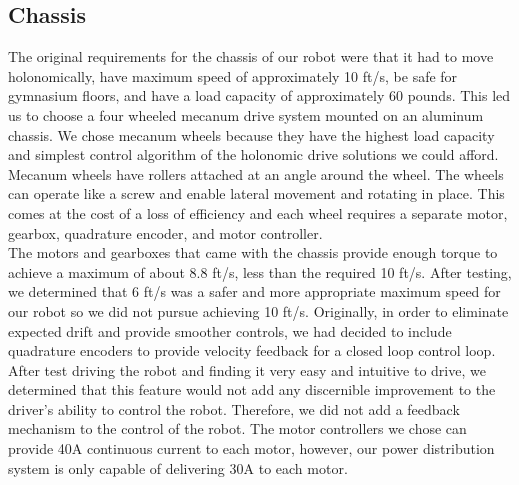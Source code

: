 \documentclass[letterpaper,12pt]{article}
\begin{document}
\subsection{Chassis}
The original requirements for the chassis of our robot were that it had to move
holonomically, have maximum speed of approximately 10
ft/s, be safe for gymnasium floors, and have a load capacity of approximately
60 pounds. This led us to choose a four wheeled mecanum drive
system mounted on an aluminum chassis. We chose mecanum wheels because they
have the highest load capacity and simplest control algorithm of the holonomic
drive solutions we could afford. Mecanum wheels have rollers attached at an
angle around the wheel. The wheels can operate like a screw and enable lateral
movement and rotating in place. This comes at the cost of a loss of efficiency
and each wheel requires a separate motor, gearbox, quadrature encoder, and
motor controller.\\

The motors and gearboxes that came with the chassis provide enough torque to
achieve a maximum of about 8.8 ft/s, less than the required 10 ft/s. After
testing, we determined that 6 ft/s was a safer and more appropriate maximum
speed for our robot so we did not pursue achieving 10 ft/s.  Originally, in
order to eliminate expected drift and provide smoother controls, we had decided
to include quadrature encoders to provide velocity feedback for a closed loop
control loop. After test driving the robot and finding it very easy and
intuitive to drive, we determined that this feature would not add any
discernible improvement to the driver's ability to control the robot.
Therefore, we did not add a feedback mechanism to the control of the robot. The
motor controllers we chose can provide 40A continuous current to each motor,
however, our power distribution system is only capable of delivering 30A to
each motor.\\
\end{document}
